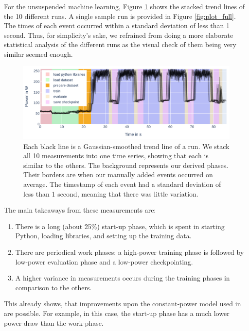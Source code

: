For the unsuspended machine learning, Figure \ref{fig:plot_full_stacked} shows the stacked trend lines of the 10 different runs.
A single sample run is provided in Figure \ref{fig:plot_full}. 
The times of each event occurred within a standard deviation of less than 1 second.
Thus, for simplicity's sake, we refrained from doing a more elaborate statistical analysis of the different runs as the visual check of them being very similar seemed enough.

\begin{figure}[H]
    \includegraphics[width=\linewidth]{power-measurements/stacked_plots/roberta_full_0714.pdf}
    \caption{Each black line is a Gaussian-smoothed trend line of a run. We stack all 10 measurements into one time series, showing that each is similar to the others. The background represents our derived phases. Their borders are when our manually added events occurred on average. The timestamp of each event had a standard deviation of less than 1 second, meaning that there was little variation.}
    \label{fig:plot_full_stacked}
\end{figure}

The main takeaways from these measurements are:
\begin{enumerate}
    \item There is a long (about 25\%) start-up phase, which is spent in starting Python, loading libraries, and setting up the training data.
    \item There are periodical work phases; a high-power training phase is followed by low-power evaluation phase and a low-power checkpointing.
    \item A higher variance in measurements occurs during the training phases in comparison to the others.
\end{enumerate}

This already shows, that improvements upon the constant-power model used in \cite{wiesner_lets_2021} are possible. 
For example, in this case, the start-up phase has a much lower power-draw than the work-phase.

